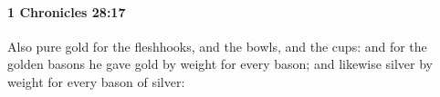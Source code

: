 
		\paragraph{1 Chronicles 28:17} %
			\label{1CHRONICLES-28-17}

			Also pure gold for the fleshhooks, and the bowls, and the cups: and for the golden basons he gave gold by weight for every bason; and likewise silver by weight for every bason of silver:



